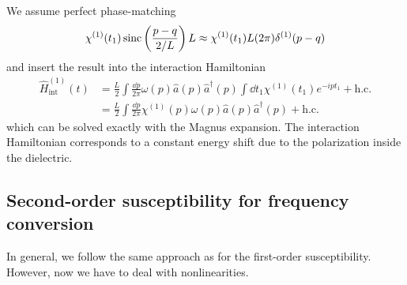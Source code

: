 We assume perfect phase-matching
\begin{equation}
	\chi^{(1)}(t_1)
	\operatorname{sinc}\left(\frac{p-q}{2/L}\right)
	L
	\approx
	\chi^{(1)}(t_1)L
	(2\pi)
	\delta^{(1)}(p-q)
\end{equation}
and insert the result into the interaction Hamiltonian
\begin{equation}
	\begin{split}
		\hat{H}_\text{int}^{(1)}(t)
		&=
		\frac{L}{2}
		\int\frac{\dd{p}}{2\pi}
		\omega(p)
		\hat{a}(p)
		\hat{a}^\dagger(p)
		\int\dd{t_1}
		\chi^{(1)}(t_1)
		e^{-ipt_1}
		+
		\text{h.c.}
		\\
		&=
		\frac{L}{2}
		\int\frac{\dd{p}}{2\pi}
		\chi^{(1)}(p)
		\omega(p)
		\hat{a}(p)
		\hat{a}^\dagger(p)
		+
		\text{h.c.}
	\end{split}
\end{equation}
which can be solved exactly with the Magnus expansion.
The interaction Hamiltonian corresponds to a constant energy shift due to the polarization inside the dielectric.

\subsection{Second-order susceptibility for frequency conversion}\label{sec:frequency_convserion}

In general, we follow the same approach as for the first-order susceptibility.
However, now we have to deal with nonlinearities.

